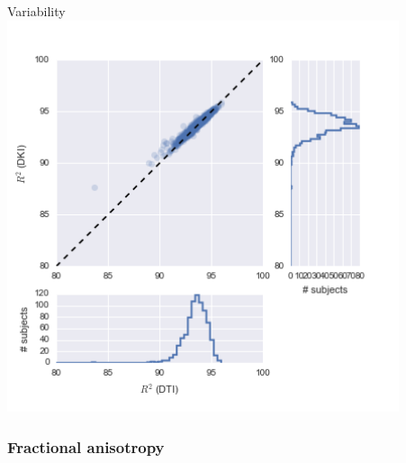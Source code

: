 \documentclass[a0, landscape]{a0poster}
\begin{document}
\begin{multicols}{3}
\begin{minipage}[b]{1\linewidth}
\begin{minipage}[b]{0.33\linewidth}
  \end{minipage}
  \begin{minipage}[b]{0.33\linewidth}
    \center Variability\\
  \includegraphics[width=11.5cm]{dti_1000_dki.png}
  \end{minipage}
\end{minipage}

\subsubsection*{Fractional anisotropy}


\end{multicols}
\end{document}
